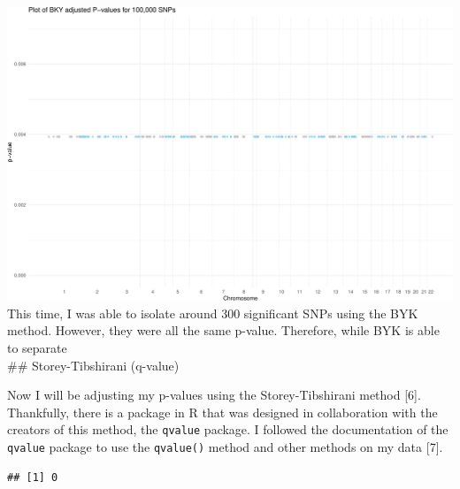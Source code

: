 \documentclass[
  12pt,
]{article}
\newenvironment{Shaded}{\begin{snugshade}}{\end{snugshade}}
\newcommand{\AttributeTok}[1]{\textcolor[rgb]{0.13,0.29,0.53}{#1}}
\newcommand{\CommentTok}[1]{\textcolor[rgb]{0.56,0.35,0.01}{\textit{#1}}}
\newcommand{\FloatTok}[1]{\textcolor[rgb]{0.00,0.00,0.81}{#1}}
\newcommand{\FunctionTok}[1]{\textcolor[rgb]{0.13,0.29,0.53}{\textbf{#1}}}
\newcommand{\NormalTok}[1]{#1}
\newcommand{\OtherTok}[1]{\textcolor[rgb]{0.56,0.35,0.01}{#1}}
\newcommand{\SpecialCharTok}[1]{\textcolor[rgb]{0.81,0.36,0.00}{\textbf{#1}}}
\begin{document}
\includegraphics{Arkesh_Das_CMSE_410_Semester_Project_files/figure-latex/BYK plot test-1.pdf}
This time, I was able to isolate around 300 significant SNPs using the
BYK method. However, they were all the same p-value. Therefore, while
BYK is able to separate\\
\#\# Storey-Tibshirani (q-value)

Now I will be adjusting my p-values using the Storey-Tibshirani method
{[}6{]}. Thankfully, there is a package in R that was designed in
collaboration with the creators of this method, the \texttt{qvalue}
package. I followed the documentation of the \texttt{qvalue} package to
use the \texttt{qvalue()} method and other methods on my data {[}7{]}.

\begin{Shaded}
\end{Shaded}

\begin{verbatim}
## [1] 0
\end{verbatim}
\end{document}
